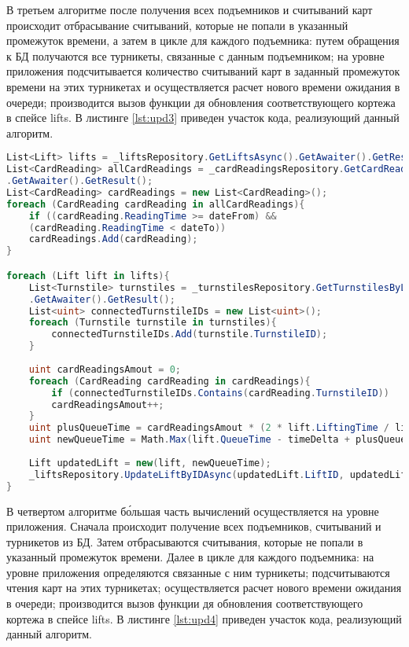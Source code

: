 В третьем алгоритме после получения всех подъемников и считываний карт происходит отбрасывание считываний, которые не попали в указанный промежуток времени, а затем в цикле для каждого подъемника: путем обращения к БД получаются все турникеты, связанные с данным подъемником; на уровне приложения подсчитывается количество считываний карт в заданный промежуток времени на этих турникетах и осуществляется расчет нового времени ожидания в очереди; производится вызов функции дя обновления соответствующего кортежа в спейсе lifts. В листинге \ref{lst:upd3} приведен участок кода, реализующий данный алгоритм.

\clearpage
\captionsetup{justification=centering,singlelinecheck=off}
\begin{lstlisting}[label=lst:upd3, caption=Третий алгоритм обновления времени ожидания в очередях к подъемникам, language=csharp]
    List<Lift> lifts = _liftsRepository.GetLiftsAsync().GetAwaiter().GetResult();
List<CardReading> allCardReadings = _cardReadingsRepository.GetCardReadingsAsync()
.GetAwaiter().GetResult();
List<CardReading> cardReadings = new List<CardReading>();
foreach (CardReading cardReading in allCardReadings){
	if ((cardReading.ReadingTime >= dateFrom) &&
	(cardReading.ReadingTime < dateTo))
	cardReadings.Add(cardReading);
}

foreach (Lift lift in lifts){
	List<Turnstile> turnstiles = _turnstilesRepository.GetTurnstilesByLiftIdAsync(lift.LiftID)
	.GetAwaiter().GetResult();
	List<uint> connectedTurnstileIDs = new List<uint>();
	foreach (Turnstile turnstile in turnstiles){
		connectedTurnstileIDs.Add(turnstile.TurnstileID);
	}
	
	uint cardReadingsAmout = 0;
	foreach (CardReading cardReading in cardReadings){
		if (connectedTurnstileIDs.Contains(cardReading.TurnstileID))
		cardReadingsAmout++;
	}
	uint plusQueueTime = cardReadingsAmout * (2 * lift.LiftingTime / lift.SeatsAmount);
	uint newQueueTime = Math.Max(lift.QueueTime - timeDelta + plusQueueTime, 0);
	
	Lift updatedLift = new(lift, newQueueTime);
	_liftsRepository.UpdateLiftByIDAsync(updatedLift.LiftID, updatedLift.LiftName, updatedLift.IsOpen, updatedLift.SeatsAmount, updatedLift.LiftingTime).GetAwaiter().GetResult();
}
\end{lstlisting}


В четвертом алгоритме б\'{о}льшая часть вычислений осуществляется на уровне приложения. Сначала происходит получение всех подъемников, считываний и турникетов из БД. Затем отбрасываются считывания, которые не попали в указанный промежуток времени. Далее в цикле для каждого подъемника: на уровне приложения определяются связанные с ним турникеты; подсчитываются чтения карт на этих турникетах; осуществляется расчет нового времени ожидания в очереди; производится вызов функции дя обновления соответствующего кортежа в спейсе lifts. В листинге \ref{lst:upd4} приведен участок кода, реализующий данный алгоритм.

